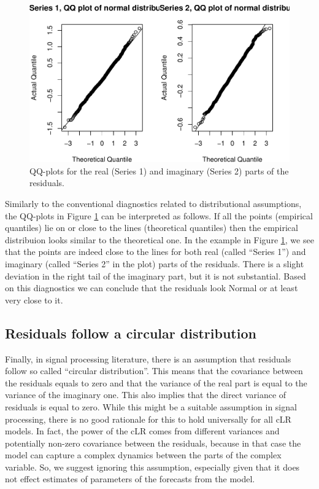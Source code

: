 \documentclass[
]{book}
\begin{document}
\begin{figure}
\centering
\includegraphics{Svetunkov---Svetunkov---Complex-Valued-Econometrics_files/figure-latex/complexNormDiagnostics-1.pdf}
\caption{\label{fig:complexNormDiagnostics}QQ-plots for the real (Series 1) and imaginary (Series 2) parts of the residuals.}
\end{figure}

Similarly to the conventional diagnostics related to distributional assumptions, the QQ-plots in Figure \ref{fig:complexNormDiagnostics} can be interpreted as follows. If all the points (empirical quantiles) lie on or close to the lines (theoretical quantiles) then the empirical distribuion looks similar to the theoretical one. In the example in Figure \ref{fig:complexNormDiagnostics}, we see that the points are indeed close to the lines for both real (called ``Series 1'') and imaginary (called ``Series 2'' in the plot) parts of the residuals. There is a slight deviation in the right tail of the imaginary part, but it is not substantial. Based on this diagnostics we can conclude that the residuals look Normal or at least very close to it.

\hypertarget{residuals-follow-a-circular-distribution}{%
\subsection{Residuals follow a circular distribution}\label{residuals-follow-a-circular-distribution}}

Finally, in signal processing literature, there is an assumption that residuals follow so called ``circular distribution''. This means that the covariance between the residuals equals to zero and that the variance of the real part is equal to the variance of the imaginary one. This also implies that the direct variance of residuals is equal to zero. While this might be a suitable assumption in signal processing, there is no good rationale for this to hold universally for all cLR models. In fact, the power of the cLR comes from different variances and potentially non-zero covariance between the residuals, because in that case the model can capture a complex dynamics between the parts of the complex variable. So, we suggest ignoring this assumption, especially given that it does not effect estimates of parameters of the forecasts from the model.
\end{document}
